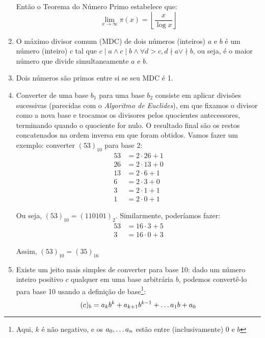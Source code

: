\documentclass{article}
\begin{document}
\begin{enumerate}
	      Então o Teorema do Número Primo estabelece que:
	      \[ \lim_{x \to \infty} \pi(x) = \left\lfloor \frac{x}{\log x} \right\rfloor \]

	\item O máximo divisor comum (MDC) de dois números (inteiros) \( a \) e \( b \) é um número (inteiro) \( c \) tal que \( c \mid a \land c \mid b \land \forall d > c, d \nmid a \lor \nmid b \), ou seja, é o maior número que divide simultaneamente \( a \) e \( b \).

	\item Dois números são primos entre si se seu MDC é 1.

	\item Converter de uma base \( b_1 \) para uma base \( b_2 \) consiste em aplicar divisões sucessivas (parecidas com o \textit{Algoritmo de Euclides}), em que fixamos o divisor como a nova base e trocamos os divisores pelos quocientes antecessores, terminando quando o quociente for nulo. O resultado final são os restos concatenados na ordem inversa em que foram obtidos. Vamos fazer um exemplo: converter \( (53)_{10} \) para base 2:
	      \begin{align*}
		      53 & = 2 \cdot 26 + 1 \\
		      26 & = 2 \cdot 13 + 0 \\
		      13 & = 2 \cdot 6 + 1  \\
		      6  & = 2 \cdot 3 + 0  \\
		      3  & = 2 \cdot 1 + 1  \\
		      1  & =  2\cdot 0 + 1
	      \end{align*}

	      Ou seja, \( (53)_{10} = (110101)_{2} \). Similarmente, poderíamos fazer:
	      \begin{align*}
		      53 & = 16 \cdot 3 + 5 \\
		      3  & = 16 \cdot 0 + 3
	      \end{align*}

	      Assim, \( (53)_{10} = (35)_{16} \)

	\item Existe um jeito mais simples de converter para base 10: dado um número inteiro positivo \( c \) qualquer em uma base arbitrária \( b \), podemos convertê-lo para base 10 usando a definição de base\footnote{Aqui, \( k \) é não negativo, e os \( a_0, \mathellipsis a_n \) estão entre (inclusivamente) 0 e \( b \)}:
	      \[ (c)_{b} = a_{k}b^{k} + a_{k+1}b^{k-1} + \mathellipsis a_{1}b + a_{0} \]


\end{enumerate}
\end{document}
